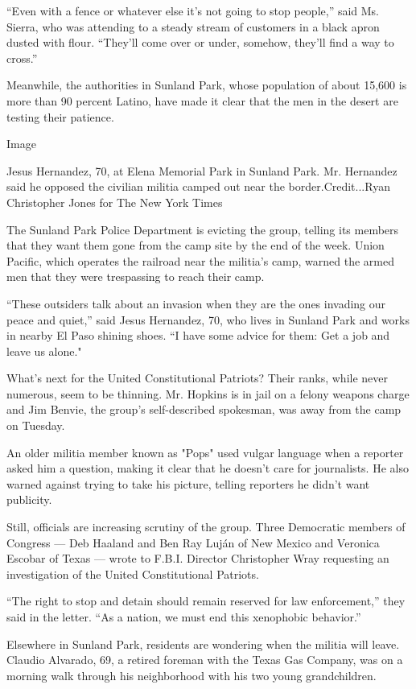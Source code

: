 ``Even with a fence or whatever else it's not going to stop people,''
said Ms. Sierra, who was attending to a steady stream of customers in a
black apron dusted with flour. ``They'll come over or under, somehow,
they'll find a way to cross.''

Meanwhile, the authorities in Sunland Park, whose population of about
15,600 is more than 90 percent Latino, have made it clear that the men
in the desert are testing their patience.

Image

Jesus Hernandez, 70, at Elena Memorial Park in Sunland Park. Mr.
Hernandez said he opposed the civilian militia camped out near the
border.Credit...Ryan Christopher Jones for The New York Times

The Sunland Park Police Department is evicting the group, telling its
members that they want them gone from the camp site by the end of the
week. Union Pacific, which operates the railroad near the militia's
camp, warned the armed men that they were trespassing to reach their
camp.

``These outsiders talk about an invasion when they are the ones invading
our peace and quiet,'' said Jesus Hernandez, 70, who lives in Sunland
Park and works in nearby El Paso shining shoes. ``I have some advice for
them: Get a job and leave us alone."

What's next for the United Constitutional Patriots? Their ranks, while
never numerous, seem to be thinning. Mr. Hopkins is in jail on a felony
weapons charge and Jim Benvie, the group's self-described spokesman, was
away from the camp on Tuesday.

An older militia member known as "Pops" used vulgar language when a
reporter asked him a question, making it clear that he doesn't care for
journalists. He also warned against trying to take his picture, telling
reporters he didn't want publicity.

Still, officials are increasing scrutiny of the group. Three Democratic
members of Congress --- Deb Haaland and Ben Ray Luján of New Mexico and
Veronica Escobar of Texas --- wrote to F.B.I. Director Christopher Wray
requesting an investigation of the United Constitutional Patriots.

``The right to stop and detain should remain reserved for law
enforcement,'' they said in the letter. ``As a nation, we must end this
xenophobic behavior.''

Elsewhere in Sunland Park, residents are wondering when the militia will
leave. Claudio Alvarado, 69, a retired foreman with the Texas Gas
Company, was on a morning walk through his neighborhood with his two
young grandchildren.

